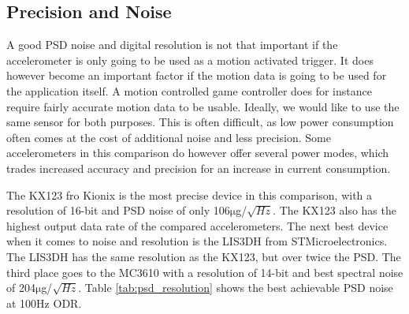 
\subsection{Precision and Noise}

A good PSD noise and digital resolution is not that important if the accelerometer is only going to be used as a motion activated trigger. It does however become an important factor if the motion data is going to be used for the application itself. A motion controlled game controller does for instance require fairly accurate motion data to be usable. Ideally, we would like to use the same sensor for both purposes. This is often difficult, as low power consumption often comes at the cost of additional noise and less precision. Some accelerometers in this comparison do however offer several power modes, which trades increased accuracy and precision for an increase in current consumption. 

The KX123 fro Kionix is the most precise device in this comparison, with a resolution of 16-bit and PSD noise of only 106$\si{\micro}$g/$\sqrt{Hz}$. The KX123 also has the highest output data rate of the compared accelerometers. The next best device when it comes to noise and resolution is the LIS3DH from STMicroelectronics. The LIS3DH has the same resolution as the KX123, but over twice the PSD. The third place goes to the MC3610 with a resolution of 14-bit and best spectral noise of 204$\si{\micro}$g/$\sqrt{Hz}$. Table \ref{tab:psd_resolution} shows the best achievable PSD noise at 100Hz ODR.  

